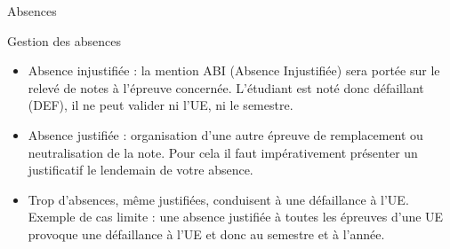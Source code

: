 \documentclass{beamer}
\begin{document}
 





 
 
 
 


 
 

 \begin{frame}{Absences}
 \begin{alertblock}{Gestion des absences}
 \begin{itemize}
 \item Absence injustifiée : la mention ABI (Absence Injustifiée) sera portée sur le relevé de notes à l'épreuve concernée. L'étudiant est noté donc défaillant (DEF), il ne peut valider ni l'UE, ni le semestre.
 \item Absence justifiée :  organisation d'une autre épreuve de remplacement ou neutralisation de la note. Pour cela il faut impérativement présenter un justificatif le lendemain de votre absence. \\ %
 \item Trop d'absences, même justifiées, conduisent à une défaillance à l'UE. Exemple de cas limite : une absence justifiée à toutes les épreuves d'une UE provoque une défaillance à l'UE et donc au semestre et à l'année.
 \end{itemize}
 \end{alertblock}
 
 \end{frame}
 
\end{document}
